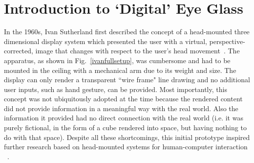 \section{Introduction to `Digital' Eye Glass}
\label{introdigitalglass}

In the 1960s, Ivan Sutherland first described the concept of a head-mounted three dimensional 
display system which presented the user with a virtual, perspective-corrected, image that changes with 
respect to the user's head movement~\cite{sutherland1968head}. The apparatus, as shown in 
Fig.~\ref{ivanfullsetup}, was cumbersome and had to be mounted in the ceiling with a mechanical arm 
due to its weight and size. The display can only render a transparent ``wire frame" line drawing and no 
additional user inputs, such as hand gesture, can be provided. Most importantly, this concept was not 
ubiquitously adopted at the time because the rendered content did not provide information in a 
meaningful way with the real world. Also the information it provided had no direct connection with the real world (i.e. it was purely fictional, in the form of a cube rendered into space, but having nothing to do with that space). Despite all these shortcomings, this initial prototype inspired 
further research based on head-mounted systems for human-computer interaction 
~\cite{feiner1993knowledge,feiner1997touring,caudell1992augmented,stoakley1995virtual,billinghurst2015rapid,kato1999marker,billinghurst2002augmented}.


